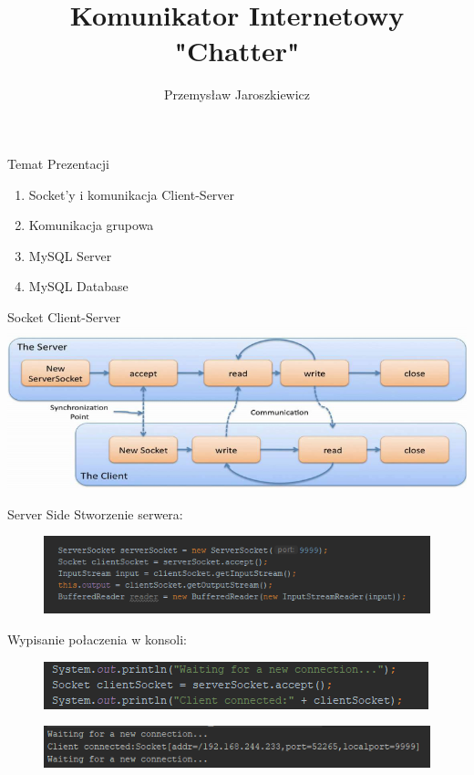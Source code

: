 \documentclass{beamer}
\title{Komunikator Internetowy "Chatter"}
\author{Przemysław Jaroszkiewicz}
\institute{Akademia Górniczo-Hutnicza im.Stanisława Staszica}
\date{}
\begin{document}
\begin{frame}
 \titlepage
\end{frame}

\begin{frame}{Temat Prezentacji}
 \begin{enumerate}
  \item Socket'y i komunikacja Client-Server
  \item Komunikacja grupowa
  \item MySQL Server
  \item MySQL Database
 \end{enumerate}
\end{frame}



\begin{frame}{Socket Client-Server}
 \includegraphics[scale=0.5]{socket_overview}
\end{frame}



\begin{frame}{Server Side}
Stworzenie serwera:
 \begin{figure}[h]
  \includegraphics[scale=0.5]{server_code}

 \end{figure}
Wypisanie połaczenia w konsoli:
 \begin{figure}
  \includegraphics[width=.6\textwidth,left]{server_write}
 \end{figure}

 \begin{figure}
  \includegraphics[width=.6\textwidth,left]{server_console}
 \end{figure}
\end{frame}
\end{document}
